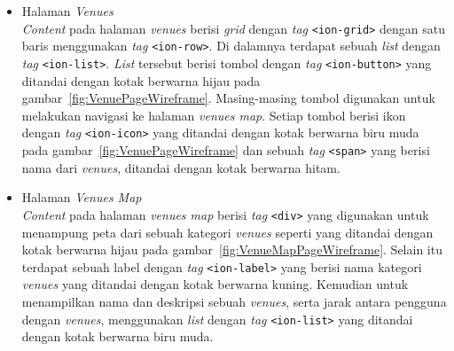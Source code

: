 \begin{enumerate}
\begin{itemize}
				\item Halaman \textit{Venues} \\
					\textit{Content} pada halaman \textit{venues} berisi \textit{grid} dengan \textit{tag} \texttt{<ion-grid>} dengan satu baris menggunakan \textit{tag} \texttt{<ion-row>}. Di dalamnya terdapat sebuah \textit{list} dengan \textit{tag} \texttt{<ion-list>}. \textit{List} tersebut berisi tombol dengan \textit{tag} \texttt{<ion-button>} yang ditandai dengan kotak berwarna hijau pada gambar~\ref{fig:VenuePageWireframe}. Masing-masing tombol digunakan untuk melakukan navigasi ke halaman \textit{venues map}. Setiap tombol berisi ikon dengan \textit{tag} \texttt{<ion-icon>} yang ditandai dengan kotak berwarna biru muda pada gambar~\ref{fig:VenuePageWireframe} dan sebuah \textit{tag} \texttt{<span>} yang berisi nama dari \textit{venues}, ditandai dengan kotak berwarna hitam.
					\newpage
				\item Halaman \textit{Venues Map} \\
					\textit{Content} pada halaman \textit{venues map} berisi \textit{tag} \texttt{<div>} yang digunakan untuk menampung peta dari sebuah kategori \textit{venues} seperti yang ditandai dengan kotak berwarna hijau pada gambar~\ref{fig:VenueMapPageWireframe}. Selain itu terdapat sebuah label dengan \textit{tag} \texttt{<ion-label>} yang berisi nama kategori \textit{venues} yang ditandai dengan kotak berwarna kuning. Kemudian untuk menampilkan nama dan deskripsi sebuah \textit{venues}, serta jarak antara pengguna dengan \textit{venues}, menggunakan \textit{list} dengan \textit{tag} \texttt{<ion-list>} yang ditandai dengan kotak berwarna biru muda. 
				
			\end{itemize}			  
	\end{enumerate}